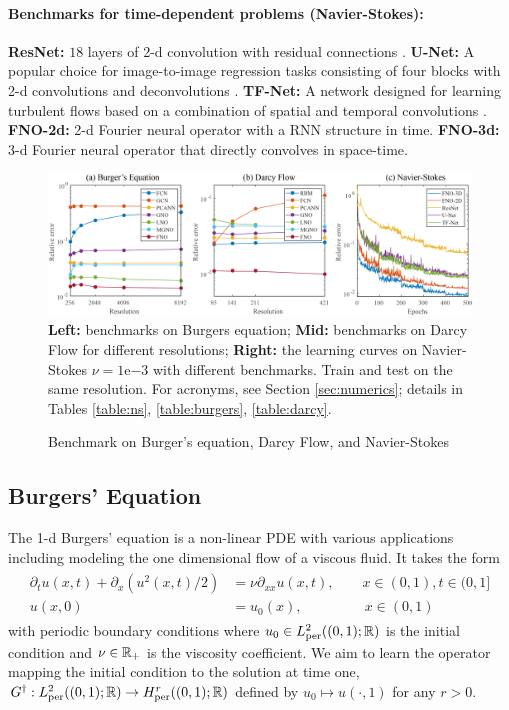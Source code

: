 \documentclass{article} %
\newcommand{\Ftrue}{G^\dagger}
\begin{document}
\paragraph{Benchmarks for time-dependent problems (Navier-Stokes):}
{\bf ResNet:} $18$ layers of 2-d convolution with residual connections \citep{he2016deep}.
{\bf U-Net:} A popular choice for image-to-image regression tasks consisting of four blocks with 2-d convolutions and deconvolutions \citep{ronneberger2015u}.
{\bf TF-Net:} A network designed for learning turbulent flows based on a combination of spatial and temporal convolutions \citep{wang2020towards}. 
{\bf FNO-2d:} 2-d Fourier neural operator with a RNN structure in time.
{\bf FNO-3d:} 3-d Fourier neural operator that directly convolves in space-time.


\begin{figure}
    \centering
    \includegraphics[width=\textwidth]{figs/FourierNN_error.png}
    {\small \textbf{Left:} benchmarks on Burgers equation;  \textbf{Mid:} benchmarks on Darcy Flow for different resolutions; \textbf{Right:} the learning curves on Navier-Stokes $\nu=1\mathrm{e}{-3}$ with different benchmarks. Train and test on the same resolution.
    For acronyms, see Section \ref{sec:numerics}; details in Tables \ref{table:ns}, \ref{table:burgers}, \ref{table:darcy}.} 
    \caption{Benchmark on Burger's equation, Darcy Flow, and Navier-Stokes}
    \label{fig:error}
\end{figure}


\subsection{Burgers' Equation}
\label{ssec:burgers}
The 1-d Burgers' equation is a non-linear PDE with various applications including modeling the one dimensional flow of a viscous fluid. It takes the form
\begin{align}
    \begin{split}
    \partial_t u(x,t) + \partial_x ( u^2(x,t)/2) &= \nu \partial_{xx} u(x,t), \qquad x \in (0,1), t \in (0,1] \\
    u(x,0) &= u_0(x), \qquad \qquad \:\: x \in (0,1)
    \end{split}
\end{align}
with periodic boundary conditions where $u_0 \in L^2_{\text{per}}((0,1);\mathbb{R})$ is the initial condition and $\nu \in \mathbb{R}_+$ is the viscosity coefficient. We aim to learn the operator mapping the initial condition to the solution at time one, $\Ftrue: L^2_{\text{per}}((0,1);\R) \to H^r_{\text{per}} ((0,1);\R)$ defined by $u_0 \mapsto u(\cdot, 1)$ for any $r > 0$.
\end{document}
